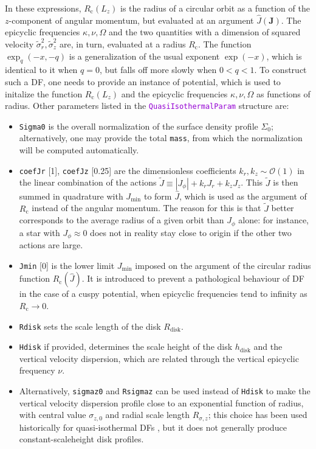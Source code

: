 \documentclass[12pt]{article}
\newcommand{\ttt}[1]{\textcolor{darkviolet}{\texttt{#1}}}
\newcommand{\ppp}[1]{\textcolor{darkolive} {\texttt{#1}}}
\begin{document}
In these expressions, $R_\mathrm{c}(L_z)$ is the radius of a circular orbit as a function of the $z$-component of angular momentum, but evaluated at an argument $\hat J(\boldsymbol J)$. The epicyclic frequencies $\kappa, \nu, \Omega$ and the two quantities with a dimension of squared velocity $\tilde\sigma_r^2, \tilde\sigma_z^2$ are, in turn, evaluated at a radius $R_\mathrm{c}$. The function $\exp_q(-x,-q)$ is a generalization of the usual exponent $\exp(-x)$, which is identical to it when $q=0$, but falls off more slowly when $0<q<1$.
To construct such a DF, one needs to provide an instance of potential, which is used to initalize the function $R_\mathrm{c}(L_z)$ and the epicyclic frequencies $\kappa, \nu, \Omega$ as functions of radius. Other parameters listed in the \ttt{QuasiIsothermalParam} structure are:
\begin{itemize}
\item \ppp{Sigma0} is the overall normalization of the surface density profile $\Sigma_0$; alternatively, one may provide the total \ppp{mass}, from which the normalization will be computed automatically.
\item \ppp{coefJr} [1], \ppp{coefJz} [0.25] are the dimensionless coefficients $k_r,k_z\sim \mathcal{O}(1)$ in the linear combination of the actions $\tilde J \equiv |J_\phi| + k_r J_r + k_z J_z$. This $\tilde J$ is then summed in quadrature with $J_\mathrm{min}$ to form $\hat J$, which is used as the argument of $R_\mathrm{c}$ instead of the angular momentum. The reason for this is that $\tilde J$ better corresponds to the average radius of a given orbit than $J_\phi$ alone: for instance, a star with $J_\phi\approx 0$ does not in reality stay close to origin if the other two actions are large. 
\item \ppp{Jmin} [0] is the lower limit $J_\mathrm{min}$ imposed on the argument of the circular radius function $R_\mathrm{c}(\hat J)$. It is introduced to prevent a pathological behaviour of DF in the case of a cuspy potential, when epicyclic frequencies tend to infinity as $R_\mathrm{c} \to 0$.
\item \ppp{Rdisk} sets the scale length of the disk $R_\mathrm{disk}$.
\item \ppp{Hdisk} if provided, determines the scale height of the disk $h_\mathrm{disk}$ and the vertical velocity dispersion, which are related through the vertical epicyclic frequency $\nu$. 
\item Alternatively, \ppp{sigmaz0} and \ppp{Rsigmaz} can be used instead of \ppp{Hdisk} to make the vertical velocity dispersion profile close to an exponential function of radius, with central value $\sigma_{z,0}$ and radial scale length $R_{\sigma,z}$; this choice has been used historically for quasi-isothermal DFs \cite{BinneyMcMillan2011,Bovy2015}, but it does not generally produce constant-scaleheight disk profiles.

\end{itemize}
\end{document}
